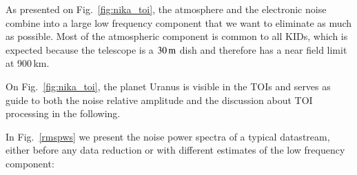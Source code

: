 
As presented on Fig.~\ref{fig:nika_toi}, the atmosphere and the electronic noise
combine into a large low frequency component that we want to eliminate as much
as possible. Most of the atmospheric component is common to all KIDs, which is
expected because the telescope is a $30\,\rm{m}$ dish and therefore
has a near field limit at 900\,km.

On Fig.~\ref{fig:nika_toi}, the planet Uranus is visible in the TOIs and serves as
guide to both the noise relative amplitude and the discussion about TOI
processing in the following.


In Fig.~\ref{rmspws} we present the noise power spectra of
a typical datastream, 
either before any data reduction or with
different estimates of the low frequency component:

